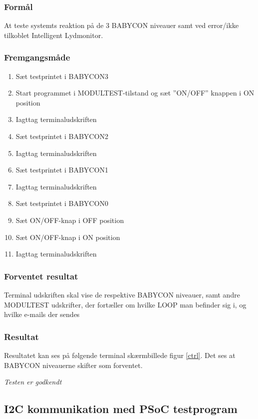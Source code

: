\subsubsection*{Formål}
At teste systemts reaktion på de 3 BABYCON niveauer samt ved error/ikke tilkoblet Intelligent Lydmonitor.

\subsubsection*{Fremgangsmåde}
\begin{enumerate}
\item Sæt testprintet i BABYCON3
\item Start programmet i MODULTEST-tilstand og sæt ''ON/OFF'' knappen i ON position
\item Iagttag terminaludskriften
\item Sæt testprintet i BABYCON2
\item Iagttag terminaludskriften
\item Sæt testprintet i BABYCON1
\item Iagttag terminaludskriften
\item Sæt testprintet i BABYCON0
\item Sæt ON/OFF-knap i OFF position
\item Sæt ON/OFF-knap i ON position
\item Iagttag terminaludskriften
\end{enumerate}

\subsubsection*{Forventet resultat} 
Terminal udskriften skal vise de respektive BABYCON niveauer, samt andre MODULTEST udskrifter, der fortæller om hvilke LOOP man befinder sig i, og hvilke e-mails der sendes

\subsubsection*{Resultat} 
Resultatet kan ses på følgende terminal skærmbillede figur \ref{ctrl}. Det ses at BABYCON niveauerne skifter som forventet.


\textit{Testen er godkendt}

\subsection*{I2C kommunikation med PSoC testprogram}

